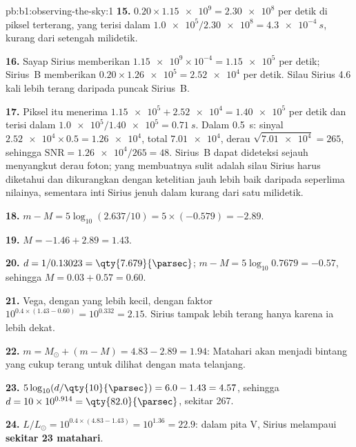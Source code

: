 \begin{solution}{pb:b1:observing-the-sky:1}
\textbf{15.} $0.20\times\num{1.15e9} = \num{2.30e8}$ per detik di piksel terterang, yang terisi dalam $\num{1.0e5}/\num{2.30e8} =
\qty{4.3e-4}{s}$, kurang dari setengah milidetik.

\textbf{16.} Sayap Sirius memberikan $\num{1.15e9}\times10^{-4} =
\num{1.15e5}$ per detik; Sirius~B memberikan $0.20\times\num{1.26e5} =
\num{2.52e4}$ per detik. Silau Sirius 4.6 kali lebih terang daripada puncak Sirius~B.

\textbf{17.} Piksel itu menerima $\num{1.15e5} + \num{2.52e4} = \num{1.40e5}$
per detik dan terisi dalam $\num{1.0e5}/\num{1.40e5} = \qty{0.71}{s}$. Dalam
\qty{0.5}{s}: sinyal $\num{2.52e4}\times0.5 = \num{1.26e4}$, total
$\num{7.01e4}$, derau $\sqrt{\num{7.01e4}} = 265$, sehingga $\mathrm{SNR} =
\num{1.26e4}/265 = 48$. Sirius~B dapat dideteksi sejauh menyangkut derau foton; yang membuatnya sulit adalah silau Sirius harus diketahui dan dikurangkan dengan ketelitian jauh lebih baik daripada seperlima nilainya, sementara inti Sirius jenuh dalam kurang dari satu milidetik.

\textbf{18.} $m - M = 5\log_{10}(2.637/10) = 5\times(-0.579) = -2.89$.

\textbf{19.} $M = -1.46 + 2.89 = 1.43$.

\textbf{20.} $d = 1/0.13023 = \qty{7.679}{\parsec}$;
$m - M = 5\log_{10}0.7679 = -0.57$, sehingga $M = 0.03 + 0.57 = 0.60$.

\textbf{21.} Vega, dengan  yang lebih kecil, dengan faktor
$10^{0.4\times(1.43 - 0.60)} = 10^{0.332} = 2.15$. Sirius tampak lebih terang hanya karena ia lebih dekat.

\textbf{22.} $m = M_\odot + (m - M) = 4.83 - 2.89 = 1.94$: Matahari akan menjadi bintang yang cukup terang untuk dilihat dengan mata telanjang.

\textbf{23.} $5\log_{10}(d/\qty{10}{\parsec}) = 6.0 - 1.43 = 4.57$, sehingga
$d = 10\times10^{0.914} = \qty{82.0}{\parsec}$, sekitar \qty{267}{\lightyear}.

\textbf{24.} $L/L_\odot = 10^{0.4\times(4.83 - 1.43)} = 10^{1.36} = 22.9$:
dalam pita V, Sirius melampaui \textbf{sekitar 23 matahari}.
\end{solution}
